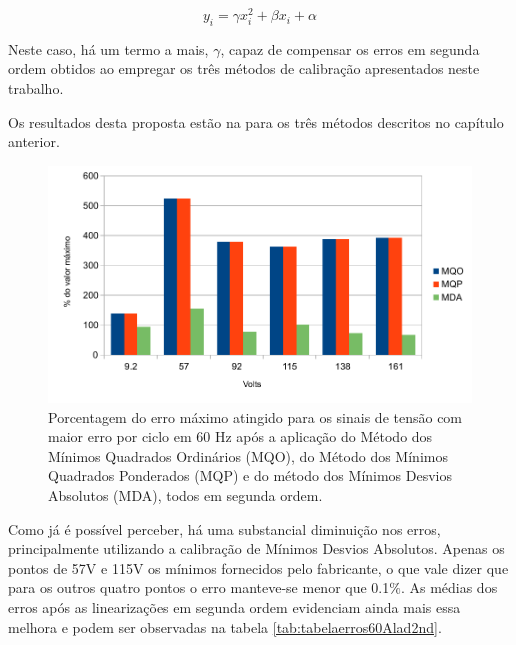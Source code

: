 \begin{equation}\label{eq:sec_order}
y_i = \gamma x_i^2 + \beta x_i + \alpha
\end{equation}

Neste caso, há um termo a mais, $\gamma$, capaz de compensar os erros em segunda ordem obtidos ao empregar os três métodos de calibração apresentados neste trabalho.  

Os resultados desta proposta estão na  para os três métodos descritos no capítulo anterior.

\begin{figure}[H]
    \caption{Porcentagem do erro máximo atingido para os sinais de tensão com maior erro por ciclo em 60 Hz após a aplicação do Método dos Mínimos Quadrados Ordinários (MQO), do Método dos Mínimos Quadrados Ponderados (MQP) e do método dos Mínimos Desvios Absolutos (MDA), todos em segunda ordem.}
    \label{fig:res_volt2nd}
    \centering
    \includegraphics[width=0.9\linewidth]{pictures/max_err_VC_aftercalib60_2nd.pdf}
\end{figure}

Como já é possível perceber, há uma substancial diminuição nos erros, principalmente utilizando a calibração de Mínimos Desvios Absolutos. Apenas os pontos de 57V e 115V os mínimos fornecidos pelo fabricante, o que vale dizer que para os outros quatro pontos o erro manteve-se menor que 0.1$\%$. As médias dos erros após as linearizações em segunda ordem evidenciam ainda mais essa melhora e podem ser observadas na tabela \ref{tab:tabelaerros60Alad2nd}.

